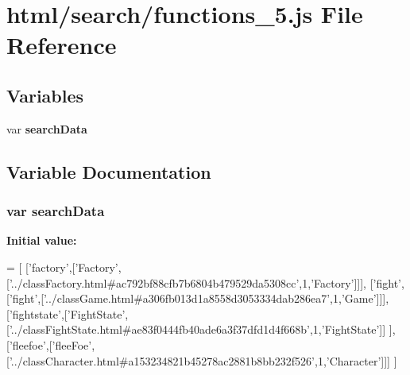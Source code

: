 \section{html/search/functions\-\_\-5.js File Reference}
\label{functions__5_8js}
\subsection*{Variables}
\begin{DoxyCompactItemize}
\item 
var {\bf search\-Data}
\end{DoxyCompactItemize}


\subsection{Variable Documentation}
\subsubsection[{search\-Data}]{\setlength{\rightskip}{0pt plus 5cm}var search\-Data}\label{functions__5_8js_ad01a7523f103d6242ef9b0451861231e}
{\bfseries Initial value\-:}
\begin{DoxyCode}
=
[
  [\textcolor{stringliteral}{'factory'},[\textcolor{stringliteral}{'Factory'},[\textcolor{stringliteral}{'../classFactory.html#ac792bf88cfb7b6804b479529da5308cc'},1,\textcolor{stringliteral}{'Factory'}]]],
  [\textcolor{stringliteral}{'fight'},[\textcolor{stringliteral}{'fight'},[\textcolor{stringliteral}{'../classGame.html#a306fb013d1a8558d3053334dab286ea7'},1,\textcolor{stringliteral}{'Game'}]]],
  [\textcolor{stringliteral}{'fightstate'},[\textcolor{stringliteral}{'FightState'},[\textcolor{stringliteral}{'../classFightState.html#ae83f0444fb40ade6a3f37dfd1d4f668b'},1,\textcolor{stringliteral}{'FightState'}]]
      ],
  [\textcolor{stringliteral}{'fleefoe'},[\textcolor{stringliteral}{'fleeFoe'},[\textcolor{stringliteral}{'../classCharacter.html#a153234821b45278ac2881b8bb232f526'},1,\textcolor{stringliteral}{'Character'}]]]
]
\end{DoxyCode}
